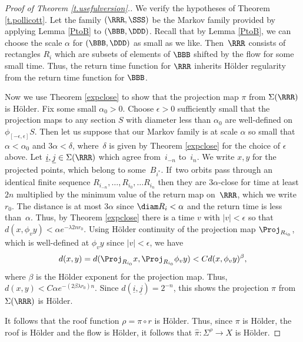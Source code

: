 \begin{proof}[Proof of Theorem \ref{t.usefulversion}.]

We verify the hypotheses of Theorem \ref{t.pollicott}. Let the family $(\RRR, \SSS)$ be the Markov family provided by applying Lemma \ref{PtoB} to $(\BBB, \DDD)$. Recall that by Lemma \ref{PtoB}, we can choose the scale $\alpha$ for $(\BBB, \DDD)$ as small as we like. Then~$\RRR$ consists of rectangles $R_i$ which are subsets of elements of $\BBB$ shifted by the flow for some small time. Thus, the return time function for $\RRR$ inherits Hölder regularity from the return time function for $\BBB$.

Now we use Theorem \ref{expclose} to show that the projection map $\pi$ from $\Sigma(\RRR)$ is Hölder. Fix some small $\alpha_0>0$. Choose $\epsilon>0$ sufficiently small that the projection maps to any section $S$ with diameter less than $\alpha_0$ are well-defined on $\phi_{[-\epsilon,\epsilon]}S$. Then let us suppose that our Markov family is at scale $\alpha$ so small that $\alpha<\alpha_0$ and $3\alpha < \delta$, where~$\delta$ is given by Theorem \ref{expclose} for the choice of $\epsilon$ above. Let $\underline i, \underline j \in \Sigma(\RRR)$ which agree from~$i_{-n}$ to~$i_n$. We write $x, y$ for the projected points, which belong to some~$B_{i^*}$. If~two orbits pass through an identical finite sequence $R_{i_{-n}}, \ldots, R_{i_0}, \ldots R_{i_n}$ then they are $3\alpha$-close for time at least $2n$ multiplied by the minimum value of the return map on~$\RRR$, which we write $r_0$. The distance is at most $3 \alpha$ since $\diam R_i < \alpha$ and the return time is less than~$\alpha$. Thus, by Theorem \ref{expclose} there is a time $v$ with $|v|<\epsilon$ so that $d(x, \phi_v y)< \alpha e^{-\lambda 2nr_0}$. Using Hölder continuity of the projection map $\Proj_{R_{i_0}}$, which is well-defined at $\phi_vy$ since $|v|<\epsilon$, we have
\[
d(x,y) = d(\Proj_{R_{i_0}}x, \Proj_{R_{i_0}}\phi_v y)< Cd(x, \phi_vy)^\beta,
\]
where $\beta$ is the Hölder exponent for the projection map. Thus, $d(x,y) < C\alpha e^{-(2\beta \lambda r_0) n}$. Since $d(\underline i, \underline j) = 2^{-n}$, this shows the projection $\pi$ from $\Sigma(\RRR)$ is Hölder.

It follows that the roof function $\rho = \pi \circ r$ is Hölder. Thus, since $\pi$ is Hölder, the roof is Hölder and the flow is Hölder, it follows that $\hat \pi: \Sigma^\rho \to X$ is Hölder.
\end{proof}

